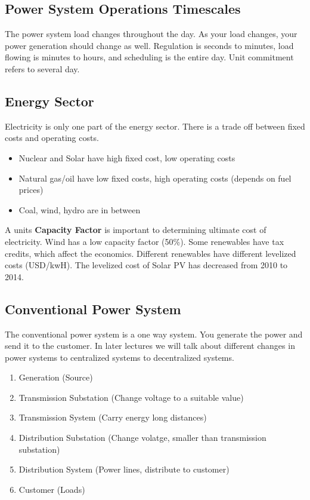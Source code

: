 \documentclass[12pt, a4paper]{report}
\begin{document}
  \subsection{Power System Operations Timescales}

  The power system load changes throughout the day. As your load changes, your power generation should change as well. Regulation is seconds to minutes, load flowing is minutes to hours, and scheduling is the entire day. Unit commitment refers to several day.

  \subsection{Energy Sector}

  Electricity is only one part of the energy sector. There is a trade off between fixed costs and operating costs.
  \begin{itemize}
    \item Nuclear and Solar have high fixed cost, low operating costs
    \item Natural gas/oil have low fixed costs, high operating costs (depends on fuel prices)
    \item Coal, wind, hydro are in between
  \end{itemize}

  \noindent
  A units \textbf{Capacity Factor} is important to determining ultimate cost of electricity. Wind has a low capacity factor (50\%). Some renewables have tax credits, which affect the economics. Different renewables have different levelized costs (USD/kwH). The levelized cost of Solar PV has decreased from 2010 to 2014.

  \newpage

  \subsection{Conventional Power System}

  The conventional power system is a one way system. You generate the power and send it to the customer. In later lectures we will talk about different changes in power systems to centralized systems to decentralized systems.
  \begin{enumerate}
    \item Generation (Source)
    \item Transmission Substation (Change voltage to a suitable value)
    \item Transmission System (Carry energy long distances)
    \item Distribution Substation (Change volatge, smaller than transmission substation)
    \item Distribution System (Power lines, distribute to customer)
    \item Customer (Loads)
  \end{enumerate}
\end{document}
